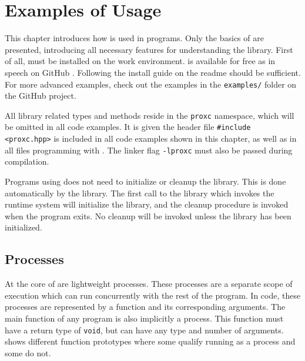 

\chapter{Examples of Usage}
\label{ch:examples_usage}

This chapter introduces how \Proxc{} is used in \Cpp{} programs. Only the basics of \Proxc{} are presented, introducing all necessary features for understanding the library. First of all, \Proxc{} must be installed on the work environment. \Proxc{} is available for free as in speech on GitHub \citep{pettersen2017proxcgithub}. Following the install guide on the readme should be sufficient. For more advanced examples, check out the examples in the \texttt{examples/} folder on the GitHub project.

All library related types and methods reside in the \lstinline[style={CustomC++}]|proxc| namespace, which will be omitted in all code examples. It is given the header file \lstinline[style={CustomC++}]|#include <proxc.hpp>| is included in all code examples shown in this chapter, as well as in all \Cpp{} files programming with \Proxc. The linker flag \lstinline[style={CustomC++}]|-lproxc| must also be passed during compilation.

Programs using \Proxc{} does not need to initialize or cleanup the library. This is done automatically by the library. The first call to the library which invokes the runtime system will initialize the library, and the cleanup procedure is invoked when the program exits. No cleanup will be invoked unless the library has been initialized. 


\section{Processes}


At the core of \Proxc{} are lightweight processes. These processes are a separate scope of execution which can run concurrently with the rest of the program. In code, these processes are represented by a function and its corresponding arguments. The main function of any \Cpp{} program is also implicitly a process. This function must have a return type of \lstinline[style={CustomC++}]|void|, but can have any type and number of arguments.  shows different function prototypes where some qualify running as a process and some do not.

